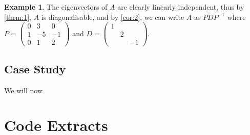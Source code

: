 \documentclass[a4paper]{article}
\theoremstyle{plain}
\theoremstyle{definition}
\newtheorem{example}[theorem]{Example}
\begin{document}
\begin{example}
	The eigenvectors of $A$ are clearly linearly independent, thus by \ref{thrm:1}, $A$ is diagonalisable, and by \ref{cor:2},
	we can write $A$ as $PDP^{-1}$ where $P=\begin{pmatrix}0&3&0\\1&-5&-1\\0&1&2\end{pmatrix}$ and $D=\begin{pmatrix}1&&\\&2&\\&&-1\end{pmatrix}$.
\end{example}
\newpage

\subsection{Case Study}

We will now


\section{Code Extracts}
%
%

% 
\nocite{*}

\appendix

\end{document}
